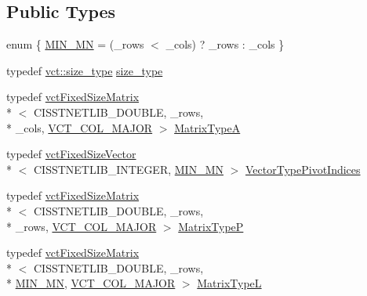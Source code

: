 \subsection*{Public Types}
\begin{DoxyCompactItemize}
\item 
enum \{ \hyperlink{classnmr_l_u_fixed_size_data_a711189aba194fb9e0854b1058f1e527aaa5d1ce549243ebe74888a9a9ede21944}{M\-I\-N\-\_\-\-M\-N} = (\-\_\-rows $<$ \-\_\-cols) ? \-\_\-rows \-: \-\_\-cols
 \}
\item 
typedef \hyperlink{namespacevct_a3e2935e13aac4500965e00d30565775b}{vct\-::size\-\_\-type} \hyperlink{classnmr_l_u_fixed_size_data_a082f0e46bc61303a725f08a300ff4276}{size\-\_\-type}
\item 
typedef \hyperlink{classvct_fixed_size_matrix}{vct\-Fixed\-Size\-Matrix}\\*
$<$ C\-I\-S\-S\-T\-N\-E\-T\-L\-I\-B\-\_\-\-D\-O\-U\-B\-L\-E, \-\_\-rows, \\*
\-\_\-cols, \hyperlink{vct_forward_declarations_8h_a432cdf8923afaf82f551450ad4034746}{V\-C\-T\-\_\-\-C\-O\-L\-\_\-\-M\-A\-J\-O\-R} $>$ \hyperlink{classnmr_l_u_fixed_size_data_aecd74a0eb81f7dae537d4cce15781210}{Matrix\-Type\-A}
\item 
typedef \hyperlink{classvct_fixed_size_vector}{vct\-Fixed\-Size\-Vector}\\*
$<$ C\-I\-S\-S\-T\-N\-E\-T\-L\-I\-B\-\_\-\-I\-N\-T\-E\-G\-E\-R, \hyperlink{classnmr_l_u_fixed_size_data_a711189aba194fb9e0854b1058f1e527aaa5d1ce549243ebe74888a9a9ede21944}{M\-I\-N\-\_\-\-M\-N} $>$ \hyperlink{classnmr_l_u_fixed_size_data_aa44bd56146e161d7b56d7f2001153ccb}{Vector\-Type\-Pivot\-Indices}
\item 
typedef \hyperlink{classvct_fixed_size_matrix}{vct\-Fixed\-Size\-Matrix}\\*
$<$ C\-I\-S\-S\-T\-N\-E\-T\-L\-I\-B\-\_\-\-D\-O\-U\-B\-L\-E, \-\_\-rows, \\*
\-\_\-rows, \hyperlink{vct_forward_declarations_8h_a432cdf8923afaf82f551450ad4034746}{V\-C\-T\-\_\-\-C\-O\-L\-\_\-\-M\-A\-J\-O\-R} $>$ \hyperlink{classnmr_l_u_fixed_size_data_aba187a86e2a881d8327e56bdbc87b159}{Matrix\-Type\-P}
\item 
typedef \hyperlink{classvct_fixed_size_matrix}{vct\-Fixed\-Size\-Matrix}\\*
$<$ C\-I\-S\-S\-T\-N\-E\-T\-L\-I\-B\-\_\-\-D\-O\-U\-B\-L\-E, \-\_\-rows, \\*
\hyperlink{classnmr_l_u_fixed_size_data_a711189aba194fb9e0854b1058f1e527aaa5d1ce549243ebe74888a9a9ede21944}{M\-I\-N\-\_\-\-M\-N}, \hyperlink{vct_forward_declarations_8h_a432cdf8923afaf82f551450ad4034746}{V\-C\-T\-\_\-\-C\-O\-L\-\_\-\-M\-A\-J\-O\-R} $>$ \hyperlink{classnmr_l_u_fixed_size_data_a6bf3bc7a9257ec14a9a47f6144fdbb4c}{Matrix\-Type\-L}

\end{DoxyCompactItemize}
